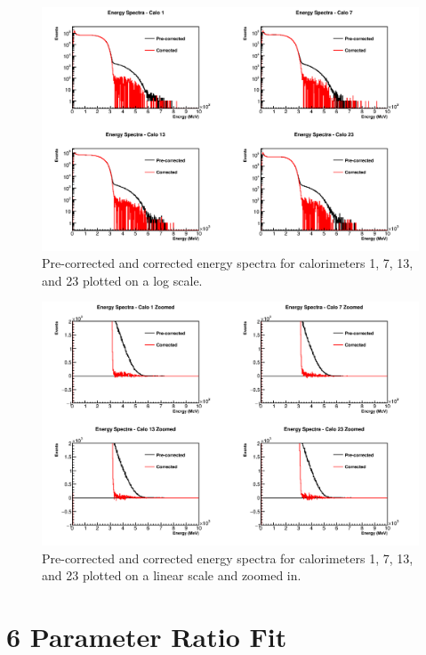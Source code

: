 \begin{figure}[]
	\centering
	\includegraphics[width=\textwidth]{CaloEnergies}
    \caption[CaloEnergies]{Pre-corrected and corrected energy spectra for calorimeters 1, 7, 13, and 23 plotted on a log scale.}    
    \label{fig:CaloEnergies}
\end{figure}

\begin{figure}[]
	\centering
	\includegraphics[width=\textwidth]{CaloEnergiesZoomed}
    \caption[CaloEnergiesZoomed]{Pre-corrected and corrected energy spectra for calorimeters 1, 7, 13, and 23 plotted on a linear scale and zoomed in.}    
    \label{fig:CaloEnergiesZoomed}
\end{figure}



\section{6 Parameter Ratio Fit}

